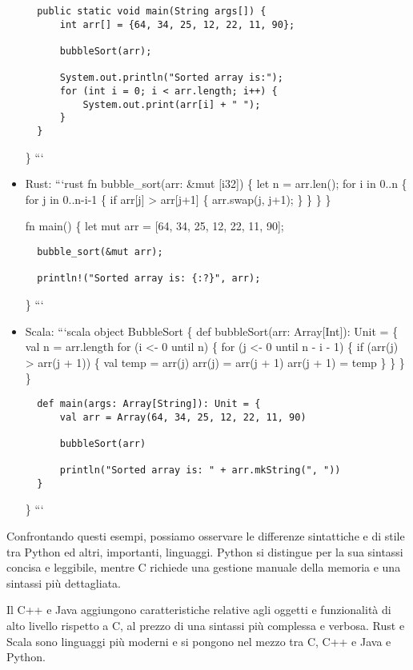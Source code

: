 \documentclass[
  letterpaper,
  DIV=11,
  numbers=noendperiod]{scrreprt}
\begin{document}
\begin{itemize}
\begin{verbatim}
  public static void main(String args[]) {
      int arr[] = {64, 34, 25, 12, 22, 11, 90};

      bubbleSort(arr);

      System.out.println("Sorted array is:");
      for (int i = 0; i < arr.length; i++) {
          System.out.print(arr[i] + " ");
      }
  }
\end{verbatim}

  \} ```
\item
  Rust: ```rust fn bubble\_sort(arr: \&mut {[}i32{]}) \{ let n =
  arr.len(); for i in 0..n \{ for j in 0..n-i-1 \{ if arr{[}j{]}
  \textgreater{} arr{[}j+1{]} \{ arr.swap(j, j+1); \} \} \} \}

  fn main() \{ let mut arr = {[}64, 34, 25, 12, 22, 11, 90{]};

\begin{verbatim}
  bubble_sort(&mut arr);

  println!("Sorted array is: {:?}", arr);
\end{verbatim}

  \} ```
\item
  Scala: ```scala object BubbleSort \{ def bubbleSort(arr:
  Array{[}Int{]}): Unit = \{ val n = arr.length for (i \textless- 0
  until n) \{ for (j \textless- 0 until n - i - 1) \{ if (arr(j)
  \textgreater{} arr(j + 1)) \{ val temp = arr(j) arr(j) = arr(j + 1)
  arr(j + 1) = temp \} \} \} \}

\begin{verbatim}
  def main(args: Array[String]): Unit = {
      val arr = Array(64, 34, 25, 12, 22, 11, 90)

      bubbleSort(arr)

      println("Sorted array is: " + arr.mkString(", "))
  }
\end{verbatim}

  \} ```
\end{itemize}

Confrontando questi esempi, possiamo osservare le differenze sintattiche
e di stile tra Python ed altri, importanti, linguaggi. Python si
distingue per la sua sintassi concisa e leggibile, mentre C richiede una
gestione manuale della memoria e una sintassi più dettagliata.

Il C++ e Java aggiungono caratteristiche relative agli oggetti e
funzionalità di alto livello rispetto a C, al prezzo di una sintassi più
complessa e verbosa. Rust e Scala sono linguaggi più moderni e si
pongono nel mezzo tra C, C++ e Java e Python.
\end{document}
